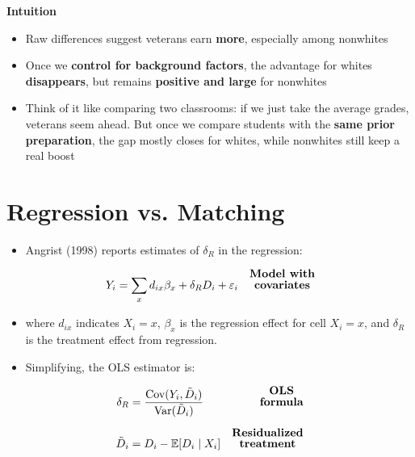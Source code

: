 \documentclass[12pt]{article}
\begin{document}
\singlespacing
\textbf{Intuition}
\begin{itemize}
    \item Raw differences suggest veterans earn \textbf{more}, especially among nonwhites
    \item Once we \textbf{control for background factors}, the advantage for whites 
    \textbf{disappears}, but remains \textbf{positive and large} for nonwhites
    \item Think of it like comparing two classrooms: if we just take the average grades, 
    veterans seem ahead. But once we compare students with the \textbf{same prior preparation}, 
    the gap mostly closes for whites, while nonwhites still keep a real boost
\end{itemize}

\section*{\noindent\textbf{Regression vs. Matching}}

\begin{itemize}
    \item Angrist (1998) reports estimates of \(\delta_R\) in the regression:
\end{itemize}

\singlespacing
\begin{align}
Y_i &= \sum_x d_{ix}\beta_x + \delta_R D_i + \varepsilon_i 
   & \text{\textbf{\shortstack{Model with \\ covariates}}}
\end{align}

\begin{itemize}
    \item where \(d_{ix}\) indicates \(X_i = x\), \(\beta_x\) is the regression effect for cell \(X_i=x\),  
    and \(\delta_R\) is the treatment effect from regression.
\end{itemize}

\begin{itemize}
    \item Simplifying, the OLS estimator is:
\end{itemize}

\singlespacing
\begin{align}
\delta_R &= \frac{\text{Cov}(Y_i, \tilde{D}_i)}{\text{Var}(\tilde{D}_i)} 
   & \text{\textbf{\shortstack{OLS \\ formula}}} \\[6pt]
\tilde{D}_i &= D_i - \mathbb{E}[D_i \mid X_i] 
   & \text{\textbf{\shortstack{Residualized \\ treatment}}}
\end{align}
\end{document}
